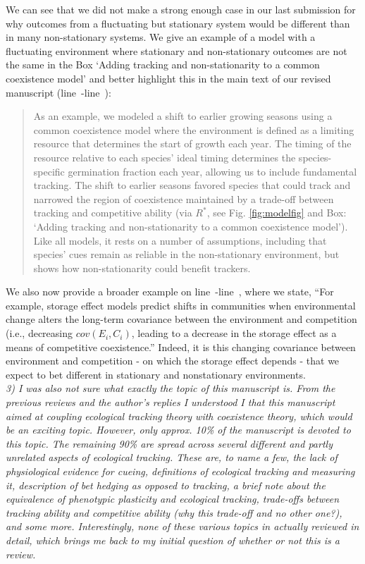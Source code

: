 \documentclass[11pt,letterpaper]{article}
\newcommand{\lr}[1]{line~\lineref{#1}}
\begin{document}
We can see that we did not make a strong enough case in our last submission for why outcomes from a fluctuating but stationary system would be different than in many non-stationary systems. We give an example of a model with a fluctuating environment where stationary and non-stationary outcomes are not the same in the Box `Adding tracking and non-stationarity to a common coexistence model' and better highlight this in the main text of our revised manuscript (\lr{r1dS1}-\lr{r1dE1}):
\begin{quote}
As an example, we modeled a shift to earlier growing seasons using a common coexistence model where the environment is defined as a limiting resource that determines the start of growth each year. The timing of the resource relative to each species' ideal timing determines the species-specific germination fraction each year, allowing us to include fundamental tracking. The shift to earlier seasons favored species that could track and narrowed the region of coexistence maintained by a trade-off between tracking and competitive ability (via $R^*$, see Fig. \ref{fig:modelfig} and Box: `Adding tracking and non-stationarity to a common coexistence model'). Like all models, it rests on a number of assumptions, including that species' cues remain as reliable in the non-stationary environment, but shows how non-stationarity could benefit trackers.
\end{quote}
We also now provide a broader example on \lr{r1dS}-\lr{r1dE}, where we state, ``For example, storage effect models predict shifts in communities when environmental change alters the long-term covariance between the environment and competition (i.e., decreasing $cov(E_i, C_i)$, leading to a decrease in the storage effect as a means of competitive coexistence.'' Indeed, it is this changing covariance between environment and competition - on which the storage effect depends - that we expect to bet different in stationary and nonstationary environments. \\

\emph{3) I was also not sure what exactly the topic of this manuscript is. From the previous
reviews and the author's replies I understood I that this manuscript aimed at coupling
ecological tracking theory with coexistence theory, which would be an exciting topic.
However, only approx. 10\% of the manuscript is devoted to this topic. The remaining 90\% are
spread across several different and partly unrelated aspects of ecological tracking. These
are, to name a few, the lack of physiological evidence for cueing, definitions of ecological
tracking and measuring it, description of bet hedging as opposed to tracking, a brief note
about the equivalence of phenotypic plasticity and ecological tracking, trade-offs between
tracking ability and competitive ability (why this trade-off and no other one?), and some
more. Interestingly, none of these various topics in actually reviewed in detail, which
brings me back to my initial question of whether or not this is a review.}\\
\end{document}
